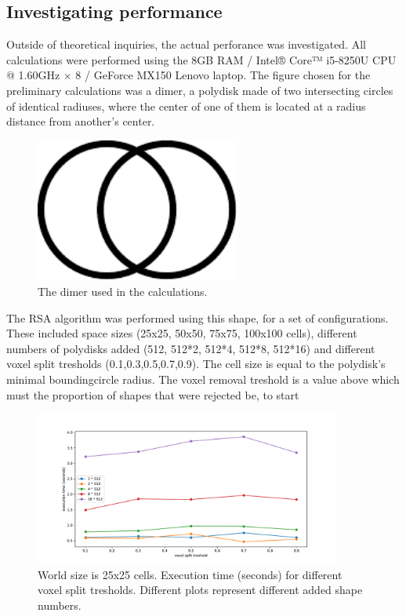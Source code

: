 \documentclass[12pt, oneside]{report}
\begin{document}
\subsection{Investigating performance}

Outside of theoretical inquiries, the actual perforance was investigated. All calculations were performed using the 8GB RAM / Intel® Core™ i5-8250U CPU @ 1.60GHz × 8 / GeForce MX150 Lenovo laptop. The figure chosen for the preliminary calculations was a dimer, a polydisk made of two intersecting circles of identical radiuses, where the center of one of them is located at a radius distance from another's center.
\begin{figure}[H]
  \centering
	\label{summary_dimer}
	\includegraphics[width=0.6\textwidth,keepaspectratio]{Images/SummaryOptimisation/dimer.pdf}
	\caption{The dimer used in the calculations.}
\end{figure}
The RSA algorithm was performed using this shape, for a set of configurations. These included space sizes (25x25, 50x50, 75x75, 100x100 cells), different numbers of polydisks added (512, 512*2, 512*4, 512*8, 512*16) and different voxel split tresholds (0.1,0.3,0.5,0.7,0.9). The cell size is equal to the polydisk's minimal boundingcircle radius.
The voxel removal treshold is a value above which must the proportion of shapes that were rejected be, to start

\begin{figure}[H]
  \centering
	\label{summary_dimer}
	\includegraphics[width=0.9\textwidth,keepaspectratio]{Images/SummaryOptimisation/results_25.pdf}
	\caption{World size is 25x25 cells. Execution time (seconds) for different voxel split tresholds. Different plots represent different added shape numbers.}
\end{figure}
\end{document}
